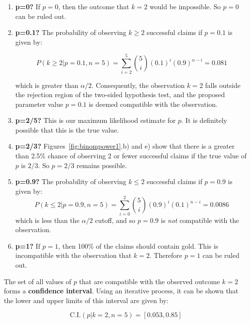 \begin{enumerate}
\item{\bf p=0?} If $p=0$, then the outcome that $k=2$ would be
  impossible.  So $p=0$ can be ruled out.
\item{\bf p=0.1?} The probability of observing ${k}\geq{2}$ successful
  claims if $p=0.1$ is given by:
  
  \[
  P({k}\geq{2}|p=0.1,n=5) =
  \sum\limits_{i=2}^{5}\binom{5}{i}(0.1)^i(0.9)^{n-i} = 0.081
  \]
  
  which is greater than $\alpha/2$. Consequently, the observation
  $k=2$ falls outside the rejection region of the two-sided hypothesis
  test, and the proposed parameter value $p=0.1$ is deemed compatible
  with the observation.
\item{\bf p=2/5?} This is our maximum likelihood estimate for $p$.  It
  is definitely possible that this is the true value.
\item{\bf p=2/3?} Figures~\ref{fig:binompower1}.b) and e) show that
  there is a greater than 2.5\% chance of observing 2 or fewer
  successful claims if the true value of $p$ is $2/3$. So $p=2/3$
  remains possible.
\item{\bf p=0.9?} The probability of observing ${k}\leq{2}$ successful
  claims if $p=0.9$ is given by:
  \[
  P({k}\leq{2}|p=0.9,n=5) =
  \sum\limits_{i=0}^{2}\binom{5}{i}(0.9)^i(0.1)^{n-i} = 0.0086
  \]
  which is less than the $\alpha/2$ cutoff, and so $p=0.9$ is
  \emph{not} compatible with the observation.
\item{\bf p=1?} If $p=1$, then 100\% of the claims should contain
  gold. This is incompatible with the observation that $k=2$.
  Therefore $p=1$ can be ruled out.
\end{enumerate}

The set of all values of $p$ that are compatible with the observed
outcome $k=2$ forms a \textbf{confidence interval}. Using an iterative
process, it can be shown that the lower and upper limits of this
interval are given by:

\[
\mbox{C.I.}(p|k=2,n=5) = [0.053, 0.85]
\]

